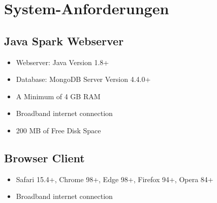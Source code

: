 \documentclass[10pt]{report}
\begin{document}
 
 
 
\chapter{System-Anforderungen}

\section{Java Spark Webserver}

\begin{itemize}
	\item Webserver: Java Version 1.8+
	\item Database: MongoDB Server Version 4.4.0+
	\item A Minimum of 4 GB RAM
	\item Broadband internet connection
	\item 200 MB of Free Disk Space 
\end{itemize}


\section{Browser Client}

\begin{itemize}
	\item Safari 15.4+, Chrome 98+, Edge 98+, Firefox 94+, Opera 84+
	\item Broadband internet connection
\end{itemize}
\end{document}
